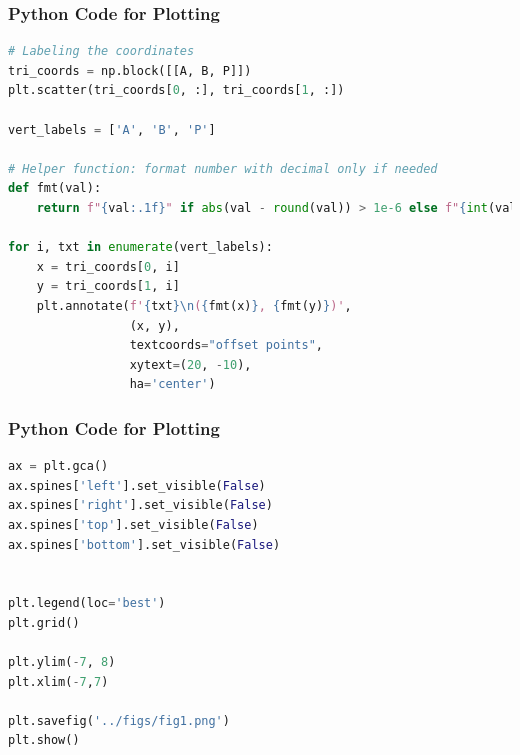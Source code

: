 \documentclass{beamer}
\theoremstyle{remark}
\numberwithin{equation}{section}
\begin{document}
\begin{frame}[fragile]
\frametitle{Python Code for Plotting}
\begin{lstlisting}[language=Python]
# Labeling the coordinates
tri_coords = np.block([[A, B, P]])
plt.scatter(tri_coords[0, :], tri_coords[1, :])

vert_labels = ['A', 'B', 'P']

# Helper function: format number with decimal only if needed
def fmt(val):
    return f"{val:.1f}" if abs(val - round(val)) > 1e-6 else f"{int(val)}"

for i, txt in enumerate(vert_labels):
    x = tri_coords[0, i]
    y = tri_coords[1, i]
    plt.annotate(f'{txt}\n({fmt(x)}, {fmt(y)})',
                 (x, y),
                 textcoords="offset points",
                 xytext=(20, -10),
                 ha='center')

\end{lstlisting}
\end{frame}

\begin{frame}[fragile]
\frametitle{Python Code for Plotting}
\begin{lstlisting}[language=Python]
ax = plt.gca()
ax.spines['left'].set_visible(False)
ax.spines['right'].set_visible(False)
ax.spines['top'].set_visible(False)
ax.spines['bottom'].set_visible(False)


plt.legend(loc='best')
plt.grid()

plt.ylim(-7, 8)
plt.xlim(-7,7)

plt.savefig('../figs/fig1.png')
plt.show()
\end{lstlisting}
\end{frame}
\end{document}
